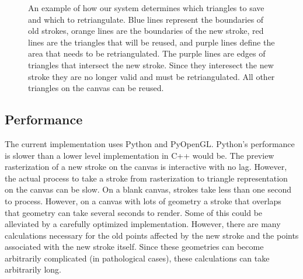 \documentclass[conference]{acmsiggraph}
\begin{document}
\begin{figure}
    \centering
    \caption{An example of how our system determines which triangles to save and which to retriangulate. Blue
    lines represent the boundaries of old strokes, orange lines are the boundaries of the new stroke, red lines are
    the triangles that will be reused, and purple lines define the area that needs to be retriangulated. The purple
    lines are edges of triangles that intersect the new stroke. Since they interesect the new stroke they are no
    longer valid and must be retriangulated. All other triangles on the canvas can be reused.}
    \label{fig:modified}
\end{figure}

\subsection{Performance}
The current implementation uses Python and PyOpenGL. Python's performance is slower than
a lower level implementation in C++ would be. The preview rasterization of a new stroke on 
the canvas is interactive with
no lag. However, the actual process to take a stroke from rasterization to triangle
representation on the canvas can be slow. On a blank canvas, strokes take less than
one second to process. However, on a canvas with lots of geometry a stroke that overlaps
that geometry can take several seconds to render. Some of this could be alleviated by a carefully optimized implementation. However, there are many calculations
necessary for the old points affected by the new stroke and the points associated with the
new stroke itself. Since these geometries can become arbitrarily complicated (in pathological cases), these
calculations can take arbitrarily long.
\end{document}

